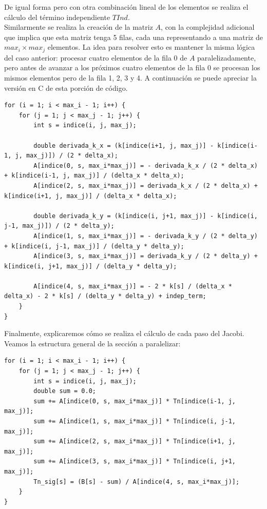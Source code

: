 \documentclass[a4paper]{article}
\begin{document}
De igual forma pero con otra combinación lineal de los elementos 
se realiza el cálculo del término independiente $TInd$. \\ 

Similarmente se realiza la creación de la matriz $A$, con la complejidad
adicional que implica que esta matriz tenga 5 filas, cada una representando
a una matriz de $max_i \times max_j$ elementos. La idea para resolver esto
es mantener la misma lógica del caso anterior: procesar cuatro elementos 
de la fila 0 de $A$ paralelizadamente, pero antes de avanzar a los próximos
cuatro elementos de la fila 0 se procesan los mismos elementos pero de la
fila 1, 2, 3 y 4. A continuación se puede apreciar la versión en C de esta
porción de código. \\

\begin{lstlisting}[caption = {Sección de la versión en C de la creación de la matriz $A$}]
for (i = 1; i < max_i - 1; i++) {
	for (j = 1; j < max_j - 1; j++) {
		int s = indice(i, j, max_j);
		
		double derivada_k_x = (k[indice(i+1, j, max_j)] - k[indice(i-1, j, max_j)]) / (2 * delta_x);
		A[indice(0, s, max_i*max_j)] = - derivada_k_x / (2 * delta_x) + k[indice(i-1, j, max_j)] / (delta_x * delta_x);
		A[indice(2, s, max_i*max_j)] = derivada_k_x / (2 * delta_x) + k[indice(i+1, j, max_j)] / (delta_x * delta_x);

		double derivada_k_y = (k[indice(i, j+1, max_j)] - k[indice(i, j-1, max_j)]) / (2 * delta_y);
		A[indice(1, s, max_i*max_j)] = - derivada_k_y / (2 * delta_y) + k[indice(i, j-1, max_j)] / (delta_y * delta_y);
		A[indice(3, s, max_i*max_j)] = derivada_k_y / (2 * delta_y) + k[indice(i, j+1, max_j)] / (delta_y * delta_y);

		A[indice(4, s, max_i*max_j)] = - 2 * k[s] / (delta_x * delta_x) - 2 * k[s] / (delta_y * delta_y) + indep_term;
	}
}
\end{lstlisting}

Finalmente, explicaremos cómo se realiza el cálculo de cada paso del
Jacobi. Veamos la estructura general de la sección a paralelizar: \\
\bigskip

\begin{lstlisting}[caption = {Sección de la versión en C del cálculo de un paso de Jacobi}]
for (i = 1; i < max_i - 1; i++) {
	for (j = 1; j < max_j - 1; j++) {
		int s = indice(i, j, max_j);
		double sum = 0.0;
		sum += A[indice(0, s, max_i*max_j)] * Tn[indice(i-1, j, max_j)];
		sum += A[indice(1, s, max_i*max_j)] * Tn[indice(i, j-1, max_j)];
		sum += A[indice(2, s, max_i*max_j)] * Tn[indice(i+1, j, max_j)];
		sum += A[indice(3, s, max_i*max_j)] * Tn[indice(i, j+1, max_j)];
		Tn_sig[s] = (B[s] - sum) / A[indice(4, s, max_i*max_j)];
	}
}
\end{lstlisting}
\end{document}
